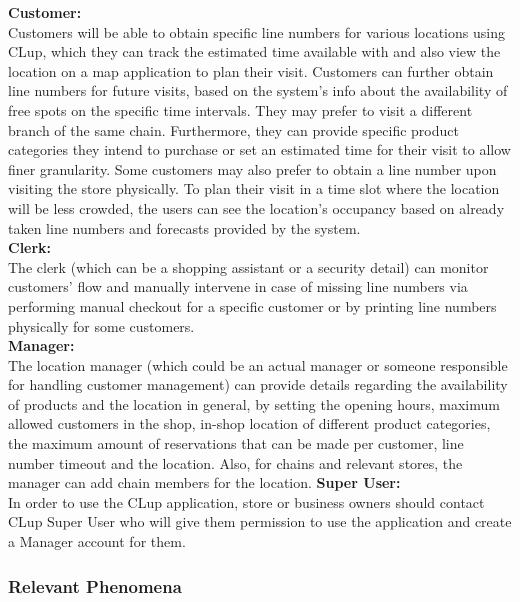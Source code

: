\textbf{Customer:} \\
Customers will be able to obtain specific line numbers for various locations using CLup, which they can track the estimated time available with and also view the location on a map application to plan their visit.
Customers can further obtain line numbers for future visits, based on the system's info about the availability of free spots on the specific time intervals.
They may prefer to visit a different branch of the same chain.
Furthermore, they can provide specific product categories they intend to purchase or set an estimated time for their visit to allow finer granularity.
Some customers may also prefer to obtain a line number upon visiting the store physically.
To plan their visit in a time slot where the location will be less crowded, the users can see the location's occupancy based on already taken line numbers and forecasts provided by the system.
\\[0.5cm]
\textbf{Clerk:} \\
The clerk (which can be a shopping assistant or a security detail) can monitor customers' flow and manually intervene in case of missing line numbers via performing manual checkout for a specific customer or by printing line numbers physically for some customers.
\\[0.5cm]
\textbf{Manager:} \\
The location manager (which could be an actual manager or someone responsible for handling customer management) can provide details regarding the availability of products and the location in general, by setting the opening hours, maximum allowed customers in the shop, in-shop location of different product categories, the maximum amount of reservations that can be made per customer, line number timeout and the location.
Also, for chains and relevant stores, the manager can add chain members for the location.
\textbf{Super User:} \\
In order to use the CLup application, store or business owners should contact CLup Super User who will give them permission to use the application and create a Manager account for them.

\subsubsection{Relevant Phenomena}


